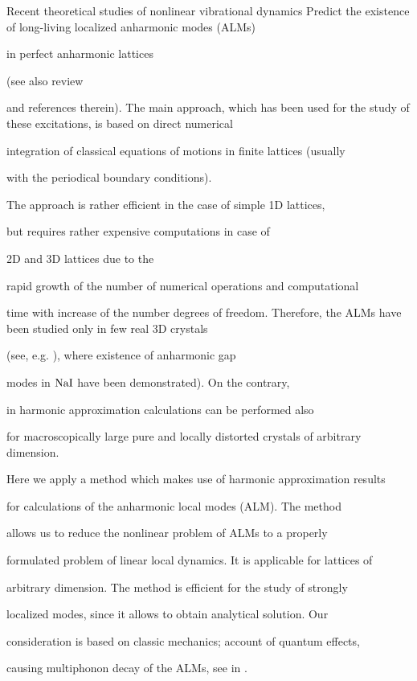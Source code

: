 Recent theoretical studies of nonlinear vibrational dynamics
Predict the existence of long-living localized anharmonic modes (ALMs)

in perfect anharmonic lattices

\cite{dolgov,sivtak,page,kiselev,zavt} (see also review 

\cite{pagesievers,flach} 

and references therein). The main approach, which has been used for
 the
study of these excitations, is based on direct numerical 

integration of classical equations of motions in finite lattices (usually 

with the periodical boundary conditions).

The approach is rather efficient in the case of simple 1D lattices, 

but requires rather expensive computations in case of

2D and 3D lattices due to the

rapid growth of the number of numerical operations and computational

time with increase of the number degrees of freedom. Therefore, the ALMs
have been studied only in few real 3D crystals

(see, e.g. \cite{kisgap}), where existence of anharmonic gap

modes  in ${\rm NaI}$ have been demonstrated). On the contrary, 

in harmonic approximation calculations can be performed also 

for macroscopically large pure and locally distorted crystals of
arbitrary dimension.



Here we apply a method which makes use of harmonic approximation results

for calculations of the anharmonic local modes (ALM). The method 

allows us to reduce the nonlinear problem of ALMs to a properly 

formulated problem of linear local dynamics. It is applicable for lattices of 

arbitrary dimension. The method is efficient for the study of strongly 

localized modes, since it allows to obtain analytical solution. Our 

consideration is based on classic mechanics; account of quantum effects,

causing multiphonon decay of the ALMs, see in \cite{hizhrev,hizhnev}. 



